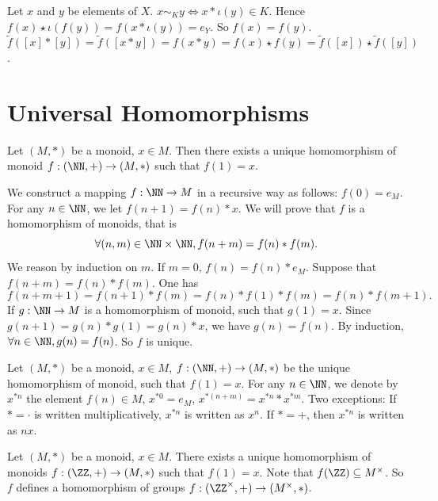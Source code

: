 \begin{proofenv}
    Let $x$ and $y$ be elements of $X$. $x\sim_K y\Leftrightarrow x*\iota(y)\in K$. Hence $f(x)\star \iota(f(y))=f(x*\iota(y))=e_Y$. So $f(x)=f(y)$. $\tilde{f}([x]*[y])=\tilde{f}([x*y])=f(x*y)=f(x)\star f(y)=\tilde{f}([x])\star \tilde{f}([y])$.
\end{proofenv}

\section{Universal Homomorphisms}
\begin{propositionenv}
    Let $(M, *)$ be a monoid,  $x\in M$. Then there exists a unique homomorphism of monoid $f:(\NN, +)\rightarrow (M, *)$ such that $f(1)=x$.
\end{propositionenv}
\begin{proofenv}
    We construct a mapping $f:\NN\rightarrow M$ in a recursive way as follows: $f(0)=e_M$. For any $n\in \NN$,  we let $f(n+1)=f(n)*x$. We will prove that $f$ is a homomorphism of monoids,  that is 
    $$\forall (n, m)\in \NN\times \NN, f(n+m)=f(n)*f(m).$$
    We reason by induction on $m$. If $m=0$,  $f(n)=f(n)*e_M$. Suppose that $f(n+m)=f(n)*f(m)$. One has $$f(n+m+1)=f(n+1)*f(m)=f(n)*f(1)*f(m)=f(n)*f(m+1).$$
    If $g:\NN\rightarrow M$ is a homomorphism of monoid,  such that $g(1)=x$. Since $g(n+1)=g(n)*g(1)=g(n)*x$,  we have $g(n)=f(n)$. By induction,  $\forall n\in \NN, g(n)=f(n)$. So $f$ is unique.
\end{proofenv}
\begin{notationenv}
    Let $(M, *)$ be a monoid,  $x\in M$,  $f:(\NN, +)\rightarrow (M, *)$ be the unique homomorphism of monoid,  such that $f(1)=x$. For any $n\in \NN$,  we denote by $x^{*n}$ the element $f(n)\in M$,  $x^{*0}=e_M$,  $x^{*(n+m)}=x^{*n}*x^{*m}$.
    \newline
    Two exceptions: If $*=\cdot$ is written multiplicatively,  $x^{*n}$ is written as $x^n$. If $*=+$,  then $x^{*n}$ is written as $nx$. 
\end{notationenv}
\begin{propositionenv}
    Let $(M, *)$ be a monoid,  $x\in M$. There exists a unique homomorphism of monoids $f:(\ZZ, +)\rightarrow (M, *)$ such that $f(1)=x$. Note that  $f(\ZZ)\subseteq M^\times$. So $f$ defines a homomorphism of groups $f:(\ZZ^\times, +)\rightarrow (M^\times, *)$.
\end{propositionenv}
